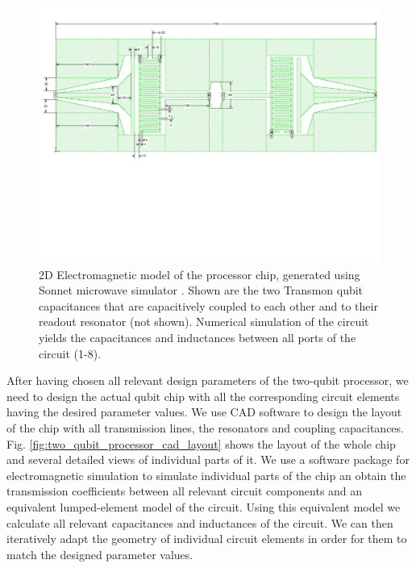 \begin{figure}[ht!]
	\centering
	\includegraphics[width=\textwidth]{./material/figures/2-qubit-processor/sonnet_simulation_of_qubit_chip}
	\caption[]{2D Electromagnetic model of the processor chip, generated using Sonnet microwave simulator \citep{}. Shown are the two Transmon qubit capacitances that are capacitively coupled to each other and to their readout resonator (not shown). Numerical simulation of the circuit yields the capacitances and inductances between all ports of the circuit (1-8).}
	\label{fig:sonnet_model_of_qubit_chip}
\end{figure}

After having chosen all relevant design parameters of the two-qubit processor, we need to design the actual qubit chip with all the corresponding circuit elements having the desired parameter values. We use CAD software to design the layout of the chip with all transmission lines, the resonators and coupling capacitances. Fig. \ref{fig:two_qubit_processor_cad_layout} shows the layout of the whole chip and several detailed views of individual parts of it. We use a software package for electromagnetic simulation \citep{} to simulate individual parts of the chip an obtain the transmission coefficients between all relevant circuit components and an equivalent lumped-element model of the circuit. Using this equivalent model we calculate all relevant capacitances and inductances of the circuit. We can then iteratively adapt the geometry of individual circuit elements in order for them to match the designed parameter values.

\smallskip

